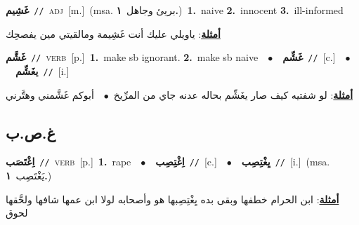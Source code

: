 \documentclass[10pt,a4paper,twoside]{article} %
\begin{document}
\begin{multicols}{2}
{\setlength\topsep{0pt}\textbf{\foreignlanguage{arabic}{غَشِيم}}\ {\color{gray}\texttt{//}\color{black}}\ \textsc{adj}\ [m.]\ \color{gray}(msa. \foreignlanguage{arabic}{بريئ وجاهل}~\foreignlanguage{arabic}{\textbf{١.}})\color{black}\ \textbf{1.}~naive  \textbf{2.}~innocent  \textbf{3.}~ill-informed\  \begin{flushright}\color{gray}\foreignlanguage{arabic}{\textbf{\underline{\foreignlanguage{arabic}{أمثلة}}}: ياويلي عليك أنت غَشِيمة ومالقيتي مين يفصحِك}\end{flushright}\color{black}} \vspace{2mm}

{\setlength\topsep{0pt}\textbf{\foreignlanguage{arabic}{غَشَّم}}\ {\color{gray}\texttt{//}\color{black}}\ \textsc{verb}\ [p.]\ \textbf{1.}~make sb ignorant.  \textbf{2.}~make sb naive\ \ $\bullet$\ \ \setlength\topsep{0pt}\textbf{\foreignlanguage{arabic}{غَشِّم}}\ {\color{gray}\texttt{//}\color{black}}\ [c.]\ \ $\bullet$\ \ \setlength\topsep{0pt}\textbf{\foreignlanguage{arabic}{يغَشِّم}}\ {\color{gray}\texttt{//}\color{black}}\ [i.]\  \begin{flushright}\color{gray}\foreignlanguage{arabic}{\textbf{\underline{\foreignlanguage{arabic}{أمثلة}}}: لو شفتيه كيف صار يغَشِّم بحاله عدنه جاي من المرِّيخ\ $\bullet$\ \  أبوكم غَشَّمني وهتَّرني}\end{flushright}\color{black}} \vspace{2mm}

\vspace{-3mm}
\subsection*{\color{blue}\foreignlanguage{arabic}{غ.ص.ب}\color{blue}{}} 

{\setlength\topsep{0pt}\textbf{\foreignlanguage{arabic}{اِغْتَصَب}}\ {\color{gray}\texttt{//}\color{black}}\ \textsc{verb}\ [p.]\ \textbf{1.}~rape\ \ $\bullet$\ \ \setlength\topsep{0pt}\textbf{\foreignlanguage{arabic}{اِغْتِصِب}}\ {\color{gray}\texttt{//}\color{black}}\ [c.]\ \ $\bullet$\ \ \setlength\topsep{0pt}\textbf{\foreignlanguage{arabic}{يِغْتِصِب}}\ {\color{gray}\texttt{//}\color{black}}\ [i.]\ \color{gray}(msa. \foreignlanguage{arabic}{يَغْتَصِب}~\foreignlanguage{arabic}{\textbf{١.}})\color{black}\  \begin{flushright}\color{gray}\foreignlanguage{arabic}{\textbf{\underline{\foreignlanguage{arabic}{أمثلة}}}: ابن الحرام خطفها وبقى بده يِغْتِصِبها هو وأصحابه لولا ابن عمها شافها ولحَّقها لحوق}\end{flushright}\color{black}} \vspace{2mm}


\end{multicols}
\end{document}
